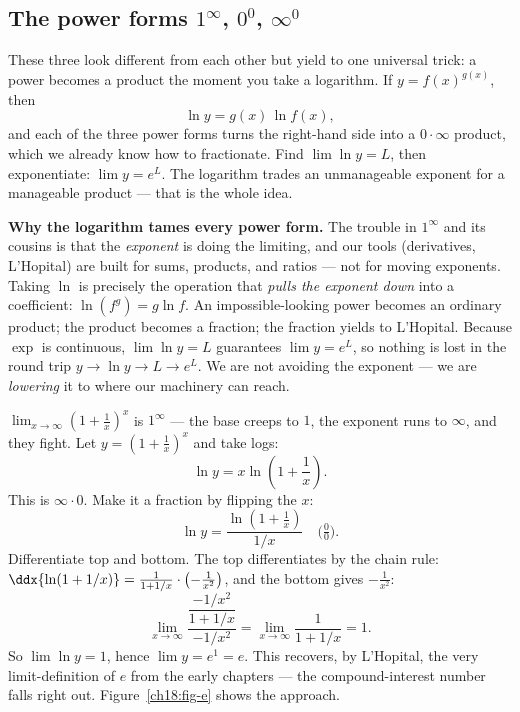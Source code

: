 \subsection{The power forms $1^{\infty}$, $0^{0}$, $\infty^{0}$}

These three look different from each other but yield to one universal trick: a power
becomes a product the moment you take a logarithm. If $y=f(x)^{g(x)}$, then
\[
\ln y=g(x)\,\ln f(x),
\]
and each of the three power forms turns the right-hand side into a $0\cdot\infty$
product, which we already know how to fractionate. Find $\lim \ln y=L$, then
exponentiate: $\lim y=e^{L}$. The logarithm trades an unmanageable exponent for a
manageable product --- that is the whole idea.

\begin{whybox}
\textbf{Why the logarithm tames every power form.} The trouble in $1^\infty$ and its
cousins is that the \emph{exponent} is doing the limiting, and our tools (derivatives,
L'Hopital) are built for sums, products, and ratios --- not for moving exponents.
Taking $\ln$ is precisely the operation that \emph{pulls the exponent down} into a
coefficient: $\ln(f^{g})=g\ln f$. An impossible-looking power becomes an ordinary
product; the product becomes a fraction; the fraction yields to L'Hopital. Because
$\exp$ is continuous, $\lim \ln y=L$ guarantees $\lim y=e^{L}$, so nothing is lost in
the round trip $y\to\ln y\to L\to e^L$. We are not avoiding the exponent --- we are
\emph{lowering} it to where our machinery can reach.
\end{whybox}

\begin{example}\label{ch18:ex-e}
$\displaystyle\lim_{x\to\infty}\left(1+\frac{1}{x}\right)^{x}$ is $1^{\infty}$ --- the
base creeps to $1$, the exponent runs to $\infty$, and they fight. Let
$y=\left(1+\tfrac1x\right)^{x}$ and take logs:
\[
\ln y=x\ln\!\left(1+\frac1x\right).
\]
This is $\infty\cdot 0$. Make it a fraction by flipping the $x$:
\[
\ln y=\frac{\ln\!\left(1+\tfrac1x\right)}{1/x}\quad\Big(\tfrac00\Big).
\]
Differentiate top and bottom. The top differentiates by the chain rule:
$\ddx{\ln(1+1/x)}=\frac{1}{1+1/x}\cdot\left(-\tfrac{1}{x^2}\right)$, and the bottom
gives $-\tfrac{1}{x^2}$:
\[
\lim_{x\to\infty}\frac{\dfrac{-1/x^2}{1+1/x}}{-1/x^2}
=\lim_{x\to\infty}\frac{1}{1+1/x}=1.
\]
So $\lim \ln y=1$, hence $\lim y=e^{1}=e$. This recovers, by L'Hopital, the very
limit-definition of $e$ from the early chapters --- the compound-interest number falls
right out. Figure~\ref{ch18:fig-e} shows the approach.
\end{example}


